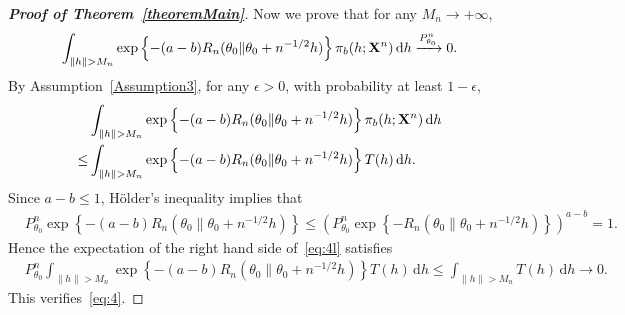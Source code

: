 \documentclass[11pt]{article}
\theoremstyle{plain}
\theoremstyle{definition}
\theoremstyle{remark}
\begin{document}
\begin{appendices}
\begin{proof}[\textbf{Proof of Theorem~\ref{theoremMain}}]
Now we prove that for any $M_n\to +\infty$,
\begin{equation}\label{eq:4}
    \int_{\|h\|> M_n}
    \exp\left\{ - (a-b) R_n ( \theta_0 \| \theta_0 + n^{-1/2} h ) \right\}
    \pi_b(h;\BX^{n})\, \mathrm dh
    \xrightarrow{P_{\theta_0}^n}0.
\end{equation}
By Assumption~\ref{Assumption3}, for any $\epsilon>0$, with probability at least $1-\epsilon$,
\begin{equation}\label{eq:4l}
    \begin{split}
    &\int_{\|h\|> M_n}
    \exp\left\{ - (a-b) R_n ( \theta_0 \| \theta_0 + n^{-1/2} h ) \right\}
    \pi_b(h;\BX^{n})\, \mathrm dh
    \\
    \leq&
    \int_{\|h\|> M_n}
    \exp\left\{ - (a-b) R_n ( \theta_0 \| \theta_0 + n^{-1/2} h ) \right\}
    T(h)\, \mathrm dh.
    \end{split}
\end{equation}
Since $a-b \leq 1$, H\"older's inequality implies that
\begin{equation*}
    \begin{split}
    &
    P^n_{\theta_0}
    \exp\left\{ - (a-b) R_n ( \theta_0 \| \theta_0 + n^{-1/2} h ) \right\}
    \leq
    \left( 
    P^n_{\theta_0}
    \exp\left\{ -  R_n ( \theta_0 \| \theta_0 + n^{-1/2} h ) \right\}
\right)^{a-b}
    = 1.
    \end{split}
\end{equation*}
Hence the expectation of the right hand side of~\eqref{eq:4l} satisfies
\begin{align*}
    &
   P^n_{\theta_0} \int_{\|h\|> M_n}
    \exp\left\{ - (a-b) R_n ( \theta_0 \| \theta_0 + n^{-1/2} h ) \right\}
   T(h)\,  \mathrm dh
   \leq
   \int_{\|h\|> M_n} T(h)\, \mathrm  dh\to 0.
\end{align*}
This verifies~\eqref{eq:4}.


\end{proof}
\end{appendices}
\end{document}
